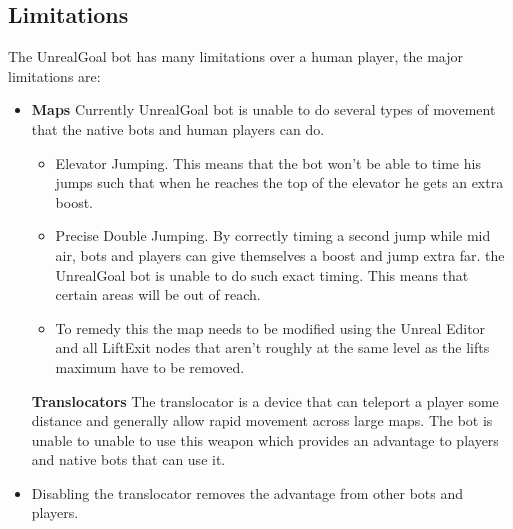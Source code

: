 \documentclass[11pt,a4paper]{article}
\begin{document}




\subsection{Limitations}
The UnrealGoal bot has many limitations over a human player, the major limitations are:

\begin{itemize}

	\item \textbf{Maps} Currently UnrealGoal bot is unable to do several types of movement that the native bots and human players can do. 
	\begin{itemize}
		\item Elevator Jumping. This means that the bot won't be able to time his jumps such that when he reaches the top of the elevator he gets an extra boost. 
		\item Precise Double Jumping. By correctly timing a second jump while mid air, bots and players can give themselves a boost and jump extra far. the UnrealGoal bot is unable to do such exact timing. This means that certain areas will be out of reach.
		\item To remedy this the map needs to be modified using the Unreal Editor and  all LiftExit nodes that aren't roughly at the same level as the lifts maximum have to be removed.
	\end{itemize}
		 \textbf{Translocators} The translocator is a device that can teleport a player some distance and generally allow rapid movement across large maps. The bot is unable to unable to use this weapon which provides an advantage to players and native bots that can use it.
		\item Disabling the translocator removes the advantage from other bots and players.
\end{itemize}
\end{document}
